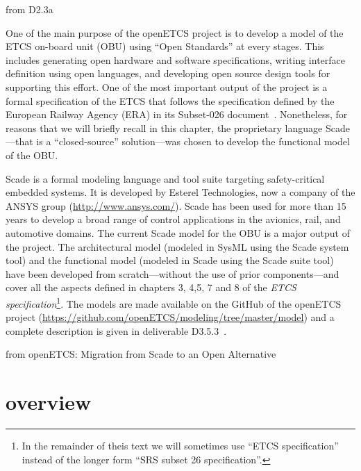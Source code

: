 \documentclass{template/openetcs_report}
\begin{document}
from D2.3a


One of the main purpose of the openETCS project is to develop a model
of the ETCS on-board unit (OBU) using ``Open Standards'' at every
stages. This includes generating open hardware and software
specifications, writing interface definition using open languages, and
developing open source design tools for supporting this effort. One of
the most important output of the project is a formal specification of
the ETCS that follows the specification defined by the European
Railway Agency (ERA) in its Subset-026
document~\cite{subset-026}. Nonetheless, for reasons that we will
briefly recall in this chapter, the proprietary language Scade---that
is a ``closed-source'' solution---was chosen to develop the functional
model of the OBU.

Scade is a formal modeling language and tool suite targeting
safety-critical embedded systems. It is developed by Esterel
Technologies, now a company of the ANSYS group
(\url{http://www.ansys.com/}). Scade has been used for more than 15
years to develop a broad range of control applications in the
avionics, rail, and automotive domains. The current Scade model for
the OBU is a major output of the project. The architectural model
(modeled in SysML using the Scade system tool) and the functional
model (modeled in Scade using the Scade suite tool) have been
developed from scratch---without the use of prior components---and
cover all the aspects defined in chapters 3, 4,5, 7 and 8 of the
\emph{ETCS specification}\footnote{In the remainder of theis text we
  will sometimes use ``ETCS specification'' instead of the longer form
  ``SRS subset 26 specification''.}. The models are made available on
the GitHub of the openETCS project
(\url{https://github.com/openETCS/modeling/tree/master/model}) and a
complete description is given in deliverable D3.5.3~\cite{d353}.

from openETCS: Migration from Scade to an Open Alternative


\section{overview}
\end{document}
